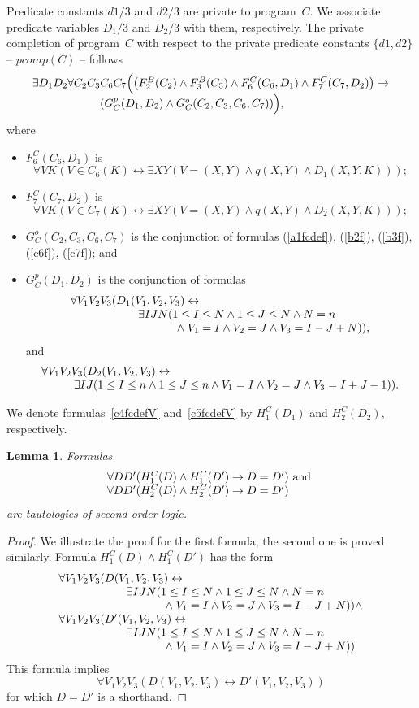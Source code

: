\documentclass[11pt]{article}
\newtheorem{lemma}{Lemma}
\def\lrar{\leftrightarrow}
\def\beq{\begin{equation}}
\def\eeq#1{\label{#1}\end{equation}}
\def\ba{\begin{array}}
\def\ea{\end{array}}
\begin{document}
\begin{adjustwidth}{-1cm}{-1cm}
Predicate constants $d1/3$ and $d2/3$ are private to program~$C$. We associate predicate variables $D_1/3$ and $D_2/3$ with them, respectively.
The private completion of program~$C$ with respect to the 
private predicate constants $\{d1,d2\}$ -- $\mathit{pcomp}(C)$ --
follows
\beq
\ba l
\exists D_1 D_2 \forall C_2 C_3 C_6 C_7\Big(\big(F^B_2(C_2)\land F^B_3(C_3)\land F^C_6(C_6,D_1)\land F^C_7(C_7,D_2)\big)\to\\
\hskip 21mm
( {G}_C^p(D_1,D_2)\land   
G^o_C(C_2, C_3, C_6, C_7))\Big),
\ea
\eeq{compCP}
where
\begin{itemize}
\item $F^C_6(C_6,D_1)$ is
$$
\forall VK(V\in C_6(K) \lrar \exists XY(V=(X,Y) \land q(X,Y) \land D_1(X,Y,K)));
$$
 \item $F^C_7(C_7,D_2)$ is
$$
\forall VK(V\in C_7(K) \lrar \exists XY(V=(X,Y) \land q(X,Y) \land D_2(X,Y,K)));
$$
\item $G^o_C(C_2, C_3, C_6, C_7)$ is the conjunction of
formulas
(\ref{a1fcdef}),
(\ref{b2f}), (\ref{b3f}), (\ref{c6f}), (\ref{c7f});
and 
\item $G^p_C(D_1,D_2)$ is the conjunction of
formulas
\beq
\ba l
\forall V_1V_2V_3( D_1(V_1,V_2,V_3)\lrar\\
\hskip 21mm
\exists I J  N(1\leq I\leq N \land 1\leq J\leq N \land N=n \\
\hskip 33mm
\land\; V_1=I\land V_2=J \land V_3= I-J+N)),
\ea
\eeq{c4fcdefV}
and
\beq
\ba l\forall V_1V_2V_3(D_2(V_1,V_2,V_3)\lrar \\
\hskip 10mm
\exists I J  (1\leq I\leq n \land 1\leq J\leq n 
\land V_1=I \land V_2=J \land V_3= I+J-1)).
\ea
\eeq{c5fcdefV}
\end{itemize}
We denote formulas~\eqref{c4fcdefV} and~\eqref{c5fcdefV} by $H^C_1(D_1)$ and $H^C_2(D_2)$, respectively.

\begin{lemma}\label{lem:privatedefs}
  Formulas
  $$
  \ba{l}
  \forall D D' (H^C_1(D)\land H^C_1(D')\to D=D') \hbox{ and }\\
  \forall D D' (H^C_2(D)\land H^C_2(D')\to D=D')\\
  \ea
  $$
  are tautologies of second-order logic.
\end{lemma}
\begin{proof}
We illustrate the proof for the first formula; the second one is proved similarly.
  Formula $H^C_1(D)\land H^C_1(D')$ has the form 
$$
\ba l
\forall V_1V_2V_3( D(V_1,V_2,V_3)\lrar\\
\hskip 21mm
\exists I J  N(1\leq I\leq N \land 1\leq J\leq N \land N=n \\
\hskip 33mm
\land\; V_1=I\land V_2=J \land V_3= I-J+N))\land\\
\forall V_1V_2V_3( D'(V_1,V_2,V_3)\lrar\\
\hskip 21mm
\exists I J  N(1\leq I\leq N \land 1\leq J\leq N \land N=n \\
\hskip 33mm
\land\; V_1=I\land V_2=J \land V_3= I-J+N))
\ea
$$ 
This formula implies
$$
\forall V_1V_2V_3( D(V_1,V_2,V_3)\lrar D'(V_1,V_2,V_3))
$$
for which $D=D'$ is a shorthand.
\end{proof}


\end{adjustwidth}
\end{document}
